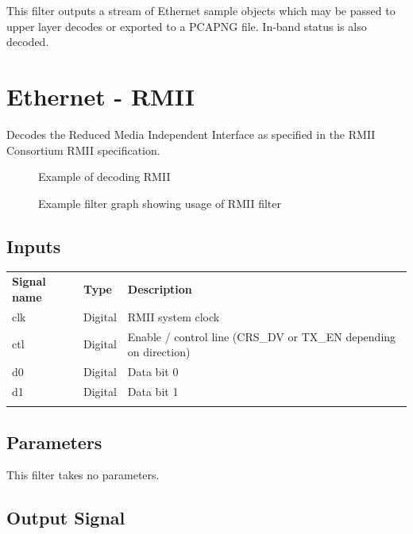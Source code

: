 This filter outputs a stream of Ethernet sample objects which may be passed to upper layer decodes or exported to a
PCAPNG file. In-band status is also decoded.

\pagebreak
\section{Ethernet - RMII}
\label{filter:rmii}

Decodes the Reduced Media Independent Interface as specified in the RMII Consortium RMII specification.

\begin{figure}[h]
\centering
{}
\caption{Example of decoding RMII}
\label{filter_rmii}
\end{figure}

\begin{figure}[h]
\centering
{}
\caption{Example filter graph showing usage of RMII filter}
\label{filter_rmii}
\end{figure}

\FloatBarrier

\subsection{Inputs}

\begin{tabularx}{16cm}{llX}
\thickhline
\textbf{Signal name} & \textbf{Type} & \textbf{Description} \\
\thickhline
clk & Digital & RMII system clock\\
\thinhline
ctl & Digital & Enable / control line (CRS\_DV or TX\_EN depending on direction) \\
\thinhline
d0 & Digital & Data bit 0 \\
\thinhline
d1 & Digital & Data bit 1 \\
\thickhline
\end{tabularx}

\subsection{Parameters}

This filter takes no parameters.

\subsection{Output Signal}

